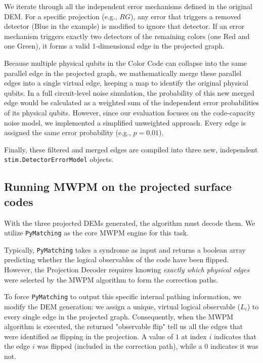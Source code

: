 We iterate through all the independent error mechanisms defined in the original DEM. For a specific projection (e.g., $RG$), any error that triggers a removed detector (Blue in the example) is modified to ignore that detector. If an error mechanism triggers exactly two detectors of the remaining colors (one Red and one Green), it forms a valid 1-dimensional edge in the projected graph.

 Because multiple physical qubits in the Color Code can collapse into the same parallel edge in the projected graph, we mathematically merge these parallel edges into a single virtual edge, keeping a map to identify the original physical qubits. In a full circuit-level noise simulation, the probability of this new merged edge would be calculated as a weighted sum of the independent error probabilities of its physical qubits. However, since our evaluation focuses on the code-capacity noise model, we implemented a simplified unweighted approach. Every edge is assigned the same error probability (e.g., $p=0.01$).

Finally, these filtered and merged edges are compiled into three new, independent \texttt{stim.DetectorErrorModel} objects.

\subsection{Running MWPM on the projected surface codes}
With the three projected DEMs generated, the algorithm must decode them. We utilize \texttt{PyMatching} as the core MWPM engine for this task. 

Typically, \texttt{PyMatching} takes a syndrome as input and returns a boolean array predicting whether the logical observables of the code have been flipped. However, the Projection Decoder requires knowing \textit{exactly which physical edges} were selected by the MWPM algorithm to form the correction paths.

To force \texttt{PyMatching} to output this specific internal pathing information, we modify the DEM generation: we assign a unique, virtual logical observable ($L_i$) to every single edge in the projected graph. Consequently, when the MWPM algorithm is executed, the returned "observable flip" tell us all the edges that were identified as flipping in the projection. A value of $1$ at index $i$ indicates that the edge $i$ was flipped (included in the correction path), while a $0$ indicates it was not.

